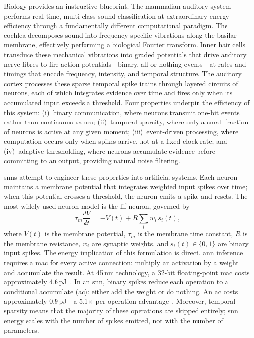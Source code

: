 Biology provides an instructive blueprint.
The mammalian auditory system performs real-time, multi-class sound classification at extraordinary energy efficiency through a fundamentally different computational paradigm.
The cochlea decomposes sound into frequency-specific vibrations along the basilar membrane, effectively performing a biological Fourier transform.
Inner hair cells transduce these mechanical vibrations into graded potentials that drive auditory nerve fibres to fire action potentials---binary, all-or-nothing events---at rates and timings that encode frequency, intensity, and temporal structure.
The auditory cortex processes these sparse temporal spike trains through layered circuits of neurons, each of which integrates evidence over time and fires only when its accumulated input exceeds a threshold.
Four properties underpin the efficiency of this system: (i)~binary communication, where neurons transmit one-bit events rather than continuous values; (ii)~temporal sparsity, where only a small fraction of neurons is active at any given moment; (iii)~event-driven processing, where computation occurs only when spikes arrive, not at a fixed clock rate; and (iv)~adaptive thresholding, where neurons accumulate evidence before committing to an output, providing natural noise filtering.

\Glspl{snn} attempt to engineer these properties into artificial systems.
Each neuron maintains a membrane potential that integrates weighted input spikes over time; when this potential crosses a threshold, the neuron emits a spike and resets.
The most widely used neuron model is the \gls{lif} neuron, governed by
\begin{equation}
    \tau_m \frac{dV}{dt} = -V(t) + R \sum_{i} w_i\, s_i(t),
    \label{eq:lif}
\end{equation}
where $V(t)$ is the membrane potential, $\tau_m$ is the membrane time constant, $R$ is the membrane resistance, $w_i$ are synaptic weights, and $s_i(t) \in \{0,1\}$ are binary input spikes.
The energy implication of this formulation is direct.
\Gls{ann} inference requires a \gls{mac} for every active connection: multiply an activation by a weight and accumulate the result.
At 45\,nm technology, a 32-bit floating-point \gls{mac} costs approximately 4.6\,pJ~\citep{horowitz2014energy}.
In an \gls{snn}, binary spikes reduce each operation to a conditional accumulate (\gls{ac}): either add the weight or do nothing.
An \gls{ac} costs approximately 0.9\,pJ---a 5.1$\times$ per-operation advantage~\citep{horowitz2014energy, yik2025neurobench}.
Moreover, temporal sparsity means that the majority of these operations are skipped entirely; \gls{snn} energy scales with the number of spikes emitted, not with the number of parameters.

